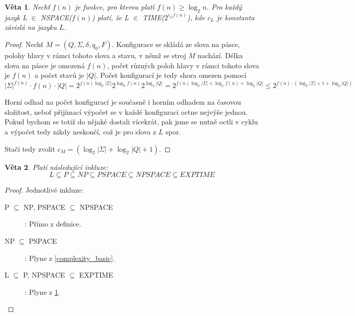 \documentclass[11pt]{report} %
\newtheorem{theorem}{Věta}[section]
\numberwithin{equation}{section}
\begin{document}
\begin{theorem}
\label{complexity_nspace_time}
Nechť $f(n)$ je funkce, pro kterou platí $f(n) \geq \log_2n$. Pro každý jazyk L $\in$ NSPACE($f(n)$) platí, že L $\in$ TIME($2^{c_L f(n)}$), kde $c_L$ je konstanta závislá na jazyku $L$.
\end{theorem}
\begin{proof}
Nechť $M = (Q, \Sigma, \delta, q_0, F)$. Konfigurace se skládá ze slova na pásce, polohy hlavy v rámci tohoto slova a stavu, v němž se stroj $M$ nachází. Délka slova na pásce je omezená $f(n)$, počet různých poloh hlavy v rámci tohoto slova je $f(n)$ a počet stavů je $|Q|$. Počet konfigurací je tedy shora omezen pomocí
$$|\Sigma|^{f(n)}\cdot f(n)\cdot |Q| = 2^{f(n) \log_2 |\Sigma|}2^{\log_2 f(n)}2^{\log_2|Q|} = 2^{f(n) \log_2 |\Sigma|+\log_2 f(n) + \log_2 |Q|} \leq 2^{f(n)·(\log_2 |\Sigma|+1+\log_2 |Q|)}$$

Horní odhad na počet konfigurací je současně i horním odhadem na časovou složitost, neboť přijímací výpočet se v každé konfiguraci octne nejvýše jednou. Pokud bychom se totiž do nějaké dostali vícekrát, pak jsme se nutně octli v cyklu a výpočet tedy nikdy neskončí, což je pro slova z $L$ spor.

Stačí tedy zvolit $c_M = (\log_2 |\Sigma| + \log_2 |Q| + 1)$. 
\end{proof}

\begin{theorem}
Platí následující inkluze:
$$L \subseteq P \subseteq NP \subseteq PSPACE \subseteq NPSPACE \subseteq EXPTIME$$
\end{theorem}
\begin{proof}
	Jednotlivé inkluze:
	\begin{description}
		
		
		\item[P $\subseteq$ NP, PSPACE $\subseteq$ NPSPACE]: Přímo z definice.
		\item[NP $\subseteq$ PSPACE]: Plyne z \ref{complexity_basic}.
		\item[L $\subseteq$ P, NPSPACE $\subseteq$ EXPTIME]: Plyne z \ref{complexity_nspace_time}.
	\end{description}

\end{proof}
\end{document}

